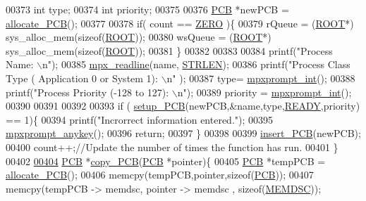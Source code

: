 \begin{DoxyCode}
{{00373         \textcolor{keywordtype}{int} type;
00374         \textcolor{keywordtype}{int} priority;
00375 
00376         \hyperlink{structprocess}{PCB} *newPCB = \hyperlink{mpx__r2_8c_a58a8a1ea0a96b9ecf0be29179a5a0a1e}{allocate_PCB}();
00377         
00378         \textcolor{keywordflow}{if}( count == \hyperlink{mpx__r2_8h_ac328e551bde3d39b6d7b8cc9e048d941}{ZERO} )\{
00379                 rQueue = (\hyperlink{structroot}{ROOT}*) sys\_alloc\_mem(\textcolor{keyword}{sizeof}(\hyperlink{structroot}{ROOT}));
00380                 wsQueue = (\hyperlink{structroot}{ROOT}*) sys\_alloc\_mem(\textcolor{keyword}{sizeof}(\hyperlink{structroot}{ROOT}));
00381         \}
00382         
00383         
00384         printf(\textcolor{stringliteral}{"Process Name: \(\backslash\)n"});
00385         \hyperlink{mpx__util_8c_a781169ab05ad54c0d37253d73060b77f}{mpx_readline}(name, \hyperlink{mpx__r2_8h_a278cf415676752815cfb411cb0b32802}{STRLEN});
00386         printf(\textcolor{stringliteral}{"Process Class Type ( Application 0 or System  1): \(\backslash\)n"} );
00387         type= \hyperlink{mpx__util_8c_aacc3dfe470919b0bd1133bce90383e18}{mpxprompt_int}();
00388         printf(\textcolor{stringliteral}{"Process Priority (-128 to 127): \(\backslash\)n"});
00389         priority = \hyperlink{mpx__util_8c_aacc3dfe470919b0bd1133bce90383e18}{mpxprompt_int}();
00390         
00391         
00392         
00393         \textcolor{keywordflow}{if} ( \hyperlink{mpx__r2_8c_a316c9619aba53c03c17afbc0a0dbf096}{setup_PCB}(newPCB,&name,type,\hyperlink{mpx__r2_8h_ad1235d5ce36f7267285e82dccd428aa6}{READY},priority) == 1)\{
00394                 printf(\textcolor{stringliteral}{"Incrorrect information entered."});
00395                 \hyperlink{mpx__util_8c_a338d01dfe3c80732c00450203c85b964}{mpxprompt_anykey}();
00396                 \textcolor{keywordflow}{return};
00397         \}       
00398         
00399         \hyperlink{mpx__r2_8c_aa3b334e3a5afd6e590917667ad359a6f}{insert_PCB}(newPCB);
00400         count++;\textcolor{comment}{//Update the number of times the function has run.}
00401 \}
00402 
\hypertarget{mpx__r2_8c_source_l00404}{}\hyperlink{mpx__r2_8c_aca3ad02d2b4c68f7653b0adf2c484ff6}{00404} \hyperlink{structprocess}{PCB} *\hyperlink{mpx__r2_8c_aca3ad02d2b4c68f7653b0adf2c484ff6}{copy_PCB}(\hyperlink{structprocess}{PCB} *pointer)\{ 
00405                 \hyperlink{structprocess}{PCB} *tempPCB = \hyperlink{mpx__r2_8c_a58a8a1ea0a96b9ecf0be29179a5a0a1e}{allocate_PCB}();
00406                 memcpy(tempPCB,pointer,\textcolor{keyword}{sizeof}(\hyperlink{structprocess}{PCB}));
00407                 memcpy(tempPCB -> memdsc, pointer -> memdsc , \textcolor{keyword}{sizeof}(\hyperlink{structmem}{MEMDSC}));
}}
\end{DoxyCode}
